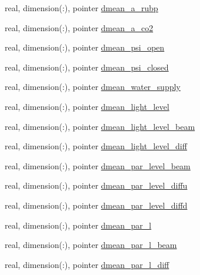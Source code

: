 \begin{DoxyCompactItemize}
real, dimension(\+:), pointer \hyperlink{structed__state__vars_1_1patchtype_af07f1967ef192026f08a73fe4bfb912e}{dmean\+\_\+a\+\_\+rubp}
\item 
real, dimension(\+:), pointer \hyperlink{structed__state__vars_1_1patchtype_af7fa7532c6e22ae0eaf09430c4b82dac}{dmean\+\_\+a\+\_\+co2}
\item 
real, dimension(\+:), pointer \hyperlink{structed__state__vars_1_1patchtype_a7866bfbc3c49753bb5981dc20ea623a4}{dmean\+\_\+psi\+\_\+open}
\item 
real, dimension(\+:), pointer \hyperlink{structed__state__vars_1_1patchtype_a9e7e0d122d584c9532bac78ad4ce9a17}{dmean\+\_\+psi\+\_\+closed}
\item 
real, dimension(\+:), pointer \hyperlink{structed__state__vars_1_1patchtype_aa8a1c2d8e000d6b1195a6a38431ab319}{dmean\+\_\+water\+\_\+supply}
\item 
real, dimension(\+:), pointer \hyperlink{structed__state__vars_1_1patchtype_a3b306c66c6900ca102614924d011a296}{dmean\+\_\+light\+\_\+level}
\item 
real, dimension(\+:), pointer \hyperlink{structed__state__vars_1_1patchtype_a7bf692865a30df5a0ff40d0a3891521d}{dmean\+\_\+light\+\_\+level\+\_\+beam}
\item 
real, dimension(\+:), pointer \hyperlink{structed__state__vars_1_1patchtype_a2e58f99f9175b80a01f12b06363e44d1}{dmean\+\_\+light\+\_\+level\+\_\+diff}
\item 
real, dimension(\+:), pointer \hyperlink{structed__state__vars_1_1patchtype_ab531473d60e6b10a7acd38cf39cb1651}{dmean\+\_\+par\+\_\+level\+\_\+beam}
\item 
real, dimension(\+:), pointer \hyperlink{structed__state__vars_1_1patchtype_acb7df216816f20a171404c7dbd3eb34d}{dmean\+\_\+par\+\_\+level\+\_\+diffu}
\item 
real, dimension(\+:), pointer \hyperlink{structed__state__vars_1_1patchtype_a45363f46f5e9e2c442362a91c8432af1}{dmean\+\_\+par\+\_\+level\+\_\+diffd}
\item 
real, dimension(\+:), pointer \hyperlink{structed__state__vars_1_1patchtype_a288f3fcd6c549c2604a0eda09a9888e0}{dmean\+\_\+par\+\_\+l}
\item 
real, dimension(\+:), pointer \hyperlink{structed__state__vars_1_1patchtype_a39fe5f67342c88ba54b3d021577e0509}{dmean\+\_\+par\+\_\+l\+\_\+beam}
\item 
real, dimension(\+:), pointer \hyperlink{structed__state__vars_1_1patchtype_af77938132a0dd42b7c894582468d880b}{dmean\+\_\+par\+\_\+l\+\_\+diff}

\end{DoxyCompactItemize}
